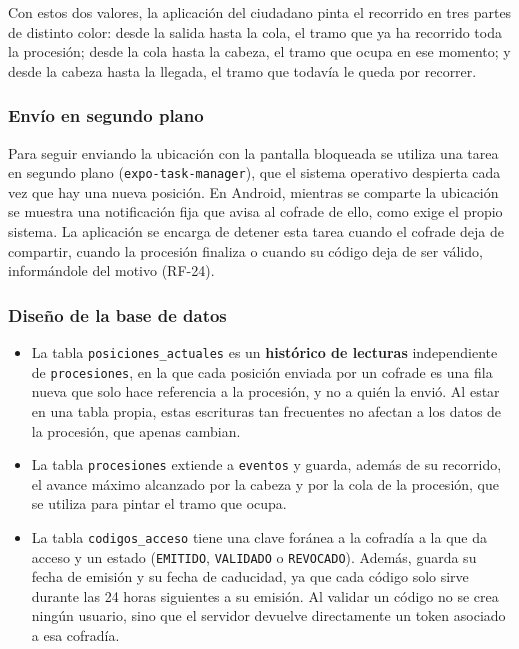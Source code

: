 Con estos dos valores, la aplicación del ciudadano pinta el recorrido en tres partes de distinto color: desde la salida hasta la cola, el tramo que ya ha recorrido toda la procesión; desde la cola hasta la cabeza, el tramo que ocupa en ese momento; y desde la cabeza hasta la llegada, el tramo que todavía le queda por recorrer.

\subsubsection{Envío en segundo plano}

Para seguir enviando la ubicación con la pantalla bloqueada se utiliza una tarea en segundo plano (\texttt{expo-task-manager}), que el sistema operativo despierta cada vez que hay una nueva posición. En Android, mientras se comparte la ubicación se muestra una notificación fija que avisa al cofrade de ello, como exige el propio sistema. La aplicación se encarga de detener esta tarea cuando el cofrade deja de compartir, cuando la procesión finaliza o cuando su código deja de ser válido, informándole del motivo (RF-24).

\subsubsection{Diseño de la base de datos}

\begin{itemize}
    \item La tabla \texttt{posiciones\_actuales} es un \textbf{histórico de lecturas} independiente de \texttt{procesiones}, en la que cada posición enviada por un cofrade es una fila nueva que solo hace referencia a la procesión, y no a quién la envió. Al estar en una tabla propia, estas escrituras tan frecuentes no afectan a los datos de la procesión, que apenas cambian.
    \item La tabla \texttt{procesiones} extiende a \texttt{eventos} y guarda, además de su recorrido, el avance máximo alcanzado por la cabeza y por la cola de la procesión, que se utiliza para pintar el tramo que ocupa.
    \item La tabla \texttt{codigos\_acceso} tiene una clave foránea a la cofradía a la que da acceso y un estado (\texttt{EMITIDO}, \texttt{VALIDADO} o \texttt{REVOCADO}). Además, guarda su fecha de emisión y su fecha de caducidad, ya que cada código solo sirve durante las 24 horas siguientes a su emisión. Al validar un código no se crea ningún usuario, sino que el servidor devuelve directamente un token asociado a esa cofradía.
\end{itemize}

